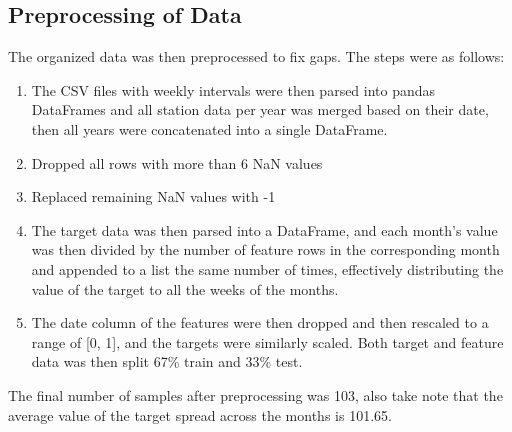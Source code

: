 ﻿\documentclass[10pt,11pt,12pt,oneside]{book}
\begin{document}
    \subsection{Preprocessing of Data}
    The organized data was then preprocessed to fix gaps. The steps were as follows:
    \begin{enumerate}
        \item The CSV files with weekly intervals were then parsed into pandas DataFrames and all station data per year was merged based on their date, then all years were concatenated into a single DataFrame.
        \item Dropped all rows with more than 6 NaN values
        \item Replaced remaining NaN values with -1
        \item The target data was then parsed into a DataFrame, and each month's value was then divided by the number of feature rows in the corresponding month and appended
to a list the same number of times, effectively distributing the value of the target to all the weeks of the months.
        \item The date column of the features were then dropped and then rescaled to a range of [0, 1], and the targets were similarly scaled. Both target and feature data was then split 67\% train and 33\%  test. 
    \end{enumerate}
    The final number of samples after preprocessing was 103, also take note that the average value of the target spread across the months is 101.65.
    \pagebreak
\end{document}
